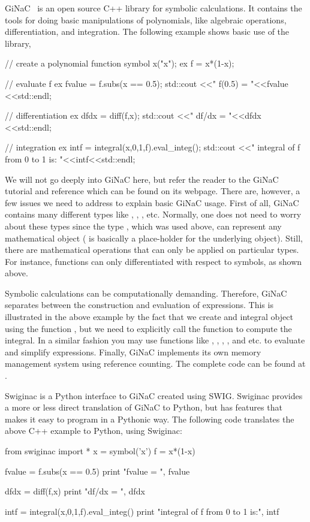 GiNaC~\cite{BauerFrinkEtAl2000} is an open source C++ library for symbolic calculations. 
It contains the tools for doing basic manipulations of polynomials, like algebraic operations, 
differentiation, and integration. 
The following example shows basic use of the library,  
\begin{code}
  // create a polynomial function
  symbol x("x");
  ex f = x*(1-x);

  // evaluate f
  ex fvalue = f.subs(x == 0.5);
  std::cout <<" f(0.5) = "<<fvalue <<std::endl;

  // differentiation
  ex dfdx  = diff(f,x);
  std::cout <<" df/dx = "<<dfdx <<std::endl;

  // integration
  ex intf  = integral(x,0,1,f).eval_integ();
  std::cout <<" integral of f from 0 to 1 is: "<<intf<<std::endl;
\end{code}
We will not go deeply into GiNaC here, but refer the reader to the 
GiNaC tutorial and reference which can be found on its webpage. There are, however, a few
issues we need to address to explain basic GiNaC usage. First of all, GiNaC 
contains many different types like , , , etc. 
Normally, one does not need to worry about these types since the type , which
was used above, can represent any mathematical object ( is basically a place-holder for the underlying 
object). Still, there are mathematical operations that can only be applied on particular 
types. For instance, functions can only differentiated with respect to symbols, as shown above.  

Symbolic calculations can be computationally demanding. Therefore, GiNaC separates between 
the construction and evaluation of expressions. This is illustrated in the above example by
the fact that we create and integral object using the function , but we 
need to explicitly call the function  to compute the integral. In a similar
fashion you may use functions like , , , , 
and    etc. to evaluate and simplify expressions. 
Finally, GiNaC implements its own memory management system using reference counting.   
The complete code can be found at .

Swiginac is a Python interface to GiNaC created using SWIG.  
Swiginac provides a more or less direct translation of GiNaC to Python, 
but has features that makes it easy to program in a Pythonic way. 
The following code translates the above C++ example to Python, using Swiginac:
\begin{code}
from swiginac import *
x = symbol('x')
f = x*(1-x) 

fvalue = f.subs(x == 0.5)
print "fvalue = ", fvalue 

dfdx = diff(f,x)
print "df/dx = ", dfdx 

intf = integral(x,0,1,f).eval_integ()
print "integral of f from 0 to 1 is:", intf 
\end{code}

